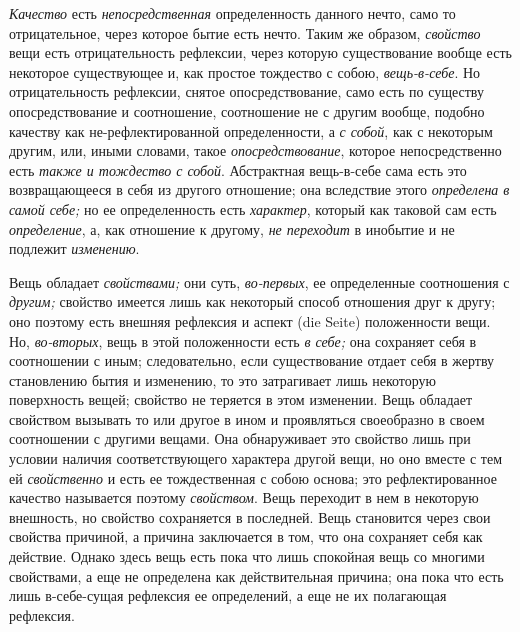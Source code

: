 {\em Качество} есть {\em непосредственная} определенность данного нечто,
само то отрицательное, через которое бытие есть нечто. Таким же образом,
{\em свойство} вещи есть отрицательность рефлексии,
через которую существование вообще есть некоторое существующее и, как
простое тождество с собою, {\em вещь-в-себе}. Но
отрицательность рефлексии, снятое опосредствование, само есть по существу
опосредствование и соотношение, соотношение не с другим вообще, подобно
качеству как не-рефлектированной определенности, а
{\em с собой}, как с некоторым другим, или, иными
словами, такое {\em опосредствование}, которое
непосредственно есть {\em также и тождество с собой}.
Абстрактная вещь-в-себе сама есть это возвращающееся в себя из другого
отношение; она вследствие этого {\em определена в самой
себе;} но ее определенность есть {\em характер},
который как таковой сам есть {\em определение}, а, как
отношение к другому, {\em не переходит} в инобытие и не
подлежит {\em изменению}.

Вещь обладает {\em свойствами;} они суть,
{\em во-первых}, ее определенные соотношения с
{\em другим;} свойство имеется лишь как некоторый
способ отношения друг к другу; оно поэтому есть внешняя рефлексия и аспект
(die Seite) положенности вещи. Но, {\em во-вторых},
вещь в этой положенности есть {\em в себе;} она
сохраняет себя в соотношении с иным; следовательно, если существование
отдает себя в жертву становлению бытия и изменению, то это затрагивает лишь
некоторую поверхность вещей; свойство не теряется в этом изменении. Вещь
обладает свойством вызывать то или другое в ином и проявляться своеобразно
в своем соотношении с другими вещами. Она обнаруживает это свойство лишь
при условии наличия соответствующего характера другой вещи, но оно вместе с
тем ей {\em свойственно} и есть ее тождественная с
собою основа; это рефлектированное качество называется поэтому
{\em свойством}. Вещь переходит в нем в некоторую
внешность, но свойство сохраняется в последней. Вещь становится через свои
свойства причиной, а причина заключается в том, что она сохраняет себя как
действие. Однако здесь вещь есть пока что лишь спокойная вещь со многими
свойствами, а еще не определена как действительная причина; она пока что
есть лишь в-себе-сущая рефлексия ее определений, а еще не их полагающая
рефлексия.

